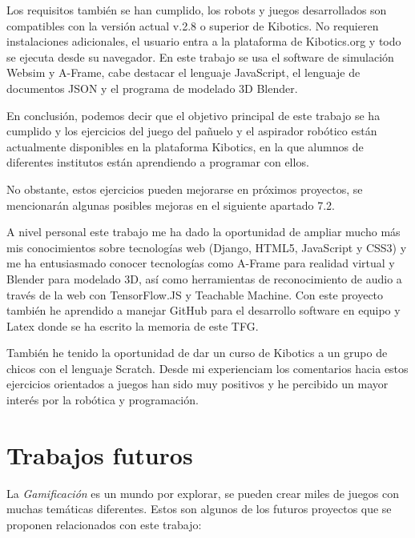 Los requisitos  también se han cumplido, los robots y juegos desarrollados son compatibles con la versión actual v.2.8 o superior de Kibotics. No requieren instalaciones adicionales, el usuario entra a la plataforma de Kibotics.org y todo se ejecuta desde su navegador.  En este trabajo se usa el software de simulación Websim y A-Frame, cabe destacar el lenguaje JavaScript, el lenguaje de documentos JSON y el programa de modelado 3D Blender.

En conclusión,  podemos decir que el objetivo principal de este trabajo se ha cumplido y los ejercicios del juego del pañuelo y el aspirador robótico están actualmente disponibles en la plataforma Kibotics, en la que alumnos de diferentes institutos están aprendiendo a programar con ellos.

No obstante, estos ejercicios pueden mejorarse en próximos proyectos, se mencionarán algunas posibles mejoras en el siguiente apartado 7.2.

A nivel personal este trabajo me ha dado la oportunidad de ampliar mucho más mis conocimientos sobre tecnologías web (Django, HTML5, JavaScript y CSS3) y me ha entusiasmado conocer tecnologías como A-Frame para realidad virtual y Blender para modelado 3D, así como herramientas de reconocimiento de audio a través de la web con TensorFlow.JS y Teachable Machine.
Con este proyecto también he aprendido a manejar GitHub para el desarrollo software en equipo y Latex donde se ha escrito la memoria de este TFG.

También he tenido la oportunidad de dar un curso de Kibotics a un grupo de chicos con el lenguaje Scratch. Desde mi experienciam los comentarios hacia estos ejercicios orientados a juegos han sido muy positivos y he percibido un mayor interés por la robótica y programación.

    
\section{Trabajos futuros}

La \textit{Gamificación} es un mundo por explorar, se pueden crear miles de juegos con muchas temáticas diferentes. Estos son algunos de los futuros proyectos que se proponen relacionados con este trabajo:

